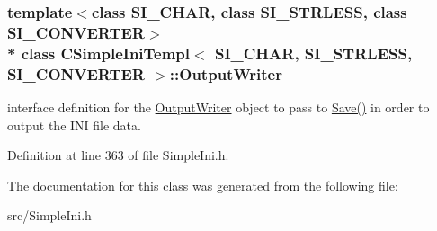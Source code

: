 \subsubsection*{template$<$class S\+I\+\_\+\+C\+H\+AR, class S\+I\+\_\+\+S\+T\+R\+L\+E\+SS, class S\+I\+\_\+\+C\+O\+N\+V\+E\+R\+T\+ER$>$\\*
class C\+Simple\+Ini\+Templ$<$ S\+I\+\_\+\+C\+H\+A\+R, S\+I\+\_\+\+S\+T\+R\+L\+E\+S\+S, S\+I\+\_\+\+C\+O\+N\+V\+E\+R\+T\+E\+R $>$\+::\+Output\+Writer}

interface definition for the \hyperlink{class_c_simple_ini_templ_1_1_output_writer}{Output\+Writer} object to pass to \hyperlink{class_c_simple_ini_templ_a5fea5d590edbb5eef694991c7c355915}{Save()} in order to output the I\+NI file data. 

Definition at line 363 of file Simple\+Ini.\+h.



The documentation for this class was generated from the following file\+:\begin{DoxyCompactItemize}
\item 
src/Simple\+Ini.\+h\end{DoxyCompactItemize}
